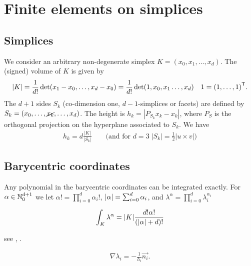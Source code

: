 %
\section{Finite elements on simplices}\label{sec:}
%
%
\subsection{Simplices}\label{subsec:}
%
We consider an arbitrary non-degenerate simplex $K=(x_0,x_1,\ldots, x_{d})$. The (signed) volume of $K$ is given by
%
\begin{equation}\label{eq:}
|K| = \frac{1}{d!} \det(x_1-x_{0},\ldots, x_{d}-x_{0})= \frac{1}{d!} \det(1,x_{0},x_1\ldots, x_{d})\quad 1={(1,\ldots,1)}^{\mathsf{T}}.
\end{equation}
%
The $d+1$ sides $S_k$ (co-dimension one, $d-1$-simplices or facets) are defined by
$S_k=(x_0,\ldots, \cancel{x_k}, \ldots, x_{d})$. The height is $h_k=|P_{S_k}x_k - x_k|$, where $P_S$ is the orthogonal projection on the hyperplane associated to $S_k$. We have
%
\begin{align*}
h_k = d\frac{|K|}{|S_k|} \qquad\mbox{(and for $d=3 \; |S_k| = \frac12 |u\times v| $)}
\end{align*}
%
%
\subsection{Barycentric coordinates}\label{subsec:}
%
%
Any polynomial in the barycentric coordinates can be integrated exactly. For $\alpha\in\mathbb N_0^{d+1}$ we 
let $\alpha! = \prod_{i=0}^d \alpha_i!$, $\left|\alpha\right|=\sum_{i=0}^d\alpha_i$, and $\lambda^{\alpha} = \prod_{i=0}^d \lambda_i^{\alpha_i}$
%
\begin{yellow}[Integration on $K$]
\begin{equation}\label{eq:IntegrationFormulaBary}
\int_K \lambda^{\alpha} =|K|\frac{ d!\alpha!}{\left( \left|\alpha\right| + d\right)!}
\end{equation}
\end{yellow}
%
see \cite{EisenbergMalvern73}, \cite{VermolenSegal18}.
%
%
\begin{yellow}
\begin{align*}
\nabla \lambda_i = - \frac{1}{h_i}\vec{n_i}. 
\end{align*}
\end{yellow}
%
%
